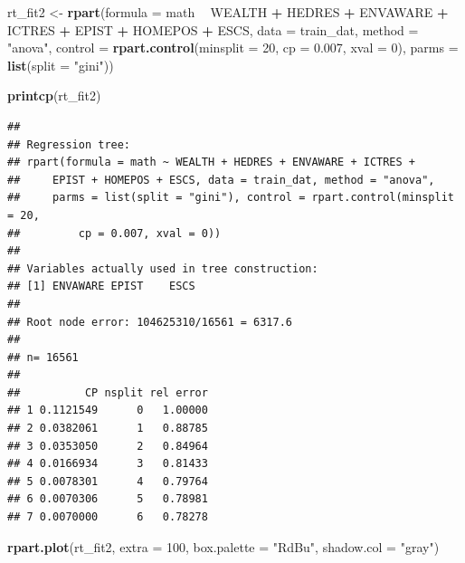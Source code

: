 \documentclass[]{book}
\newenvironment{Shaded}{\begin{snugshade}}{\end{snugshade}}
\newcommand{\DataTypeTok}[1]{\textcolor[rgb]{0.13,0.29,0.53}{#1}}
\newcommand{\DecValTok}[1]{\textcolor[rgb]{0.00,0.00,0.81}{#1}}
\newcommand{\FloatTok}[1]{\textcolor[rgb]{0.00,0.00,0.81}{#1}}
\newcommand{\KeywordTok}[1]{\textcolor[rgb]{0.13,0.29,0.53}{\textbf{#1}}}
\newcommand{\NormalTok}[1]{#1}
\newcommand{\OperatorTok}[1]{\textcolor[rgb]{0.81,0.36,0.00}{\textbf{#1}}}
\newcommand{\StringTok}[1]{\textcolor[rgb]{0.31,0.60,0.02}{#1}}
\begin{document}
\begin{Shaded}
\begin{Highlighting}[]
\NormalTok{rt_fit2 <-}\StringTok{ }\KeywordTok{rpart}\NormalTok{(}\DataTypeTok{formula =}\NormalTok{ math }\OperatorTok{~}\StringTok{ }\NormalTok{WEALTH }\OperatorTok{+}\StringTok{ }\NormalTok{HEDRES }\OperatorTok{+}\StringTok{ }\NormalTok{ENVAWARE }\OperatorTok{+}\StringTok{ }
\StringTok{                  }\NormalTok{ICTRES }\OperatorTok{+}\StringTok{ }\NormalTok{EPIST }\OperatorTok{+}\StringTok{ }\NormalTok{HOMEPOS }\OperatorTok{+}\StringTok{ }\NormalTok{ESCS,}
                 \DataTypeTok{data =}\NormalTok{ train_dat,}
                 \DataTypeTok{method =} \StringTok{"anova"}\NormalTok{, }
                 \DataTypeTok{control =} \KeywordTok{rpart.control}\NormalTok{(}\DataTypeTok{minsplit =} \DecValTok{20}\NormalTok{, }
                                         \DataTypeTok{cp =} \FloatTok{0.007}\NormalTok{,}
                                         \DataTypeTok{xval =} \DecValTok{0}\NormalTok{),}
                \DataTypeTok{parms =} \KeywordTok{list}\NormalTok{(}\DataTypeTok{split =} \StringTok{"gini"}\NormalTok{))}

\KeywordTok{printcp}\NormalTok{(rt_fit2)}
\end{Highlighting}
\end{Shaded}

\begin{verbatim}
## 
## Regression tree:
## rpart(formula = math ~ WEALTH + HEDRES + ENVAWARE + ICTRES + 
##     EPIST + HOMEPOS + ESCS, data = train_dat, method = "anova", 
##     parms = list(split = "gini"), control = rpart.control(minsplit = 20, 
##         cp = 0.007, xval = 0))
## 
## Variables actually used in tree construction:
## [1] ENVAWARE EPIST    ESCS    
## 
## Root node error: 104625310/16561 = 6317.6
## 
## n= 16561 
## 
##          CP nsplit rel error
## 1 0.1121549      0   1.00000
## 2 0.0382061      1   0.88785
## 3 0.0353050      2   0.84964
## 4 0.0166934      3   0.81433
## 5 0.0078301      4   0.79764
## 6 0.0070306      5   0.78981
## 7 0.0070000      6   0.78278
\end{verbatim}

\begin{Shaded}
\begin{Highlighting}[]
\KeywordTok{rpart.plot}\NormalTok{(rt_fit2, }\DataTypeTok{extra =} \DecValTok{100}\NormalTok{, }\DataTypeTok{box.palette =} \StringTok{"RdBu"}\NormalTok{, }\DataTypeTok{shadow.col =} \StringTok{"gray"}\NormalTok{)}
\end{Highlighting}
\end{Shaded}
\end{document}
